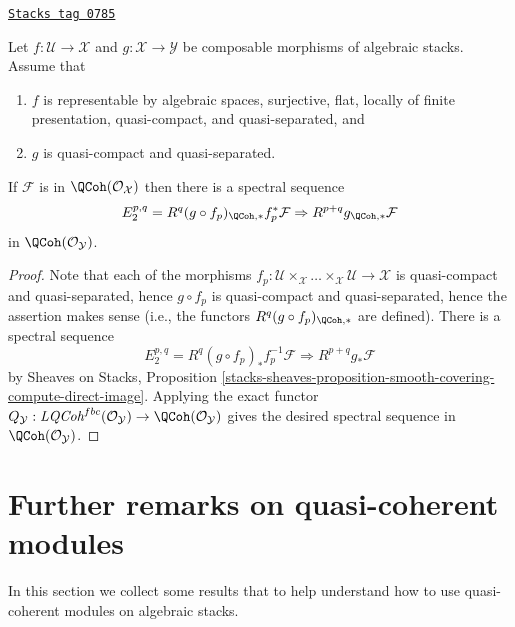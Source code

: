 \begin{proposition}
\label{stacks-cohomology-proposition-smooth-covering-compute-direct-image}
\href{https://stacks.math.columbia.edu/tag/0785}{\texttt{Stacks tag 0785}}

Let $f : \mathcal{U} \to \mathcal{X}$ and $g : \mathcal{X} \to \mathcal{Y}$
be composable morphisms of algebraic stacks.
Assume that
\begin{enumerate}
\item $f$ is representable by algebraic spaces, surjective,
flat, locally of finite presentation, quasi-compact, and quasi-separated, and
\item $g$ is quasi-compact and quasi-separated.
\end{enumerate}
If $\mathcal{F}$ is in $\QCoh(\mathcal{O}_\mathcal{X})$ then
there is a spectral sequence
$$
E_2^{p, q} = R^q(g \circ f_p)_{\QCoh, *}f_p^*\mathcal{F}
\Rightarrow
R^{p + q}g_{\QCoh, *}\mathcal{F}
$$
in $\QCoh(\mathcal{O}_\mathcal{Y})$.
\end{proposition}

\begin{proof}
Note that each of the morphisms
$f_p : \mathcal{U} \times_\mathcal{X} \ldots \times_\mathcal{X} \mathcal{U} \to
\mathcal{X}$ is quasi-compact and quasi-separated, hence $g \circ f_p$
is quasi-compact and quasi-separated, hence the assertion makes sense
(i.e., the functors $R^q(g \circ f_p)_{\QCoh, *}$ are defined).
There is a spectral sequence
$$
E_2^{p, q} = R^q(g \circ f_p)_*f_p^{-1}\mathcal{F}
\Rightarrow
R^{p + q}g_*\mathcal{F}
$$
by Sheaves on Stacks, Proposition
\ref{stacks-sheaves-proposition-smooth-covering-compute-direct-image}.
Applying the exact functor
$Q_\mathcal{Y} : \textit{LQCoh}^{fbc}(\mathcal{O}_\mathcal{Y}) \to
\QCoh(\mathcal{O}_\mathcal{Y})$ gives the desired spectral sequence in
$\QCoh(\mathcal{O}_\mathcal{Y})$.
\end{proof}

\section{Further remarks on quasi-coherent modules}
\label{stacks-cohomology-section-further-remarks}
In this section we collect some results that to help understand how
to use quasi-coherent modules on algebraic stacks.

